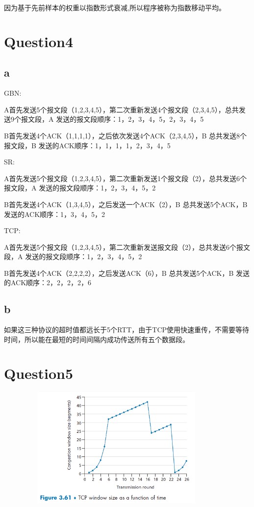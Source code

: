 \documentclass[UTF8]{article}
\begin{document}
因为基于先前样本的权重以指数形式衰减,所以程序被称为指数移动平均。

\section*{Question4}
\subsection*{a}
\noindent
GBN:

A首先发送5个报文段（1,2,3,4,5），第二次重新发送4个报文段（2,3,4,5），总共发送9个报文段，A 发送的报文段顺序：1，2，3，4，5，2，3，4，5

B首先发送4个ACK（1,1,1,1），之后依次发送4个ACK（2,3,4,5），B 总共发送8个报文段，B 发送的ACK顺序：1，1，1，1，2，3，4，5

\noindent
SR:

A首先发送5个报文段（1,2,3,4,5），第二次重新发送1个报文段（2），总共发送6个报文段，A 发送的报文段顺序：1，2，3，4，5，2

B首先发送4个ACK（1,3,4,5），之后发送一个ACK（2），B 总共发送5个ACK，B 发送的ACK顺序：1，3，4，5，2

\noindent
TCP:

A首先发送5个报文段（1,2,3,4,5），第二次重新发送报文段（2），总共发送6个报文段，A 发送的报文段顺序：1，2，3，4，5，2

B首先发送4个ACK（2,2,2,2），之后发送ACK（6），B 总共发送5个ACK，B 发送的ACK顺序：2，2，2，2，6
\subsection*{b}
如果这三种协议的超时值都远长于5个RTT，由于TCP使用快速重传，不需要等待时间，所以能在最短的时间间隔内成功传送所有五个数据段。
\section*{Question5}
\begin{figure}[ht]
    \centering
    \includegraphics[width=10cm,height=6cm]{1.png}
\end{figure}
\end{document}
